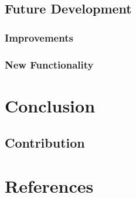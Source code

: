 \documentclass{l4proj}
\begin{document}
\section{Future Development}


\subsection{Improvements}


\subsection{New Functionality}


\chapter{Conclusion}


\section{Contribution}

\chapter{References}
\end{document}
